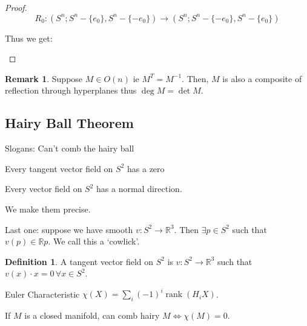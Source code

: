\documentclass{article}
\theoremstyle{definition}
\newtheorem*{definition}{Definition}
\newtheorem*{remark}{Remark}
\begin{document}
\begin{proof}
        \[
            R_0: (S^n; S^n - \{ e_0 \}, S^n - \{ -e_0 \}) \to (S^n; S^n - \{ -e_0 \}, S^n - \{ e_0 \} )
        \]

        Thus we get:
        
        \begin{center}
        \end{center}

    \end{proof}

    \begin{remark}
        Suppose \(M\in O(n)\) ie \(M^T = M ^{-1}\). Then, \(M\) is also a composite of reflection through hyperplanes thus \(\deg M = \det M\).
    \end{remark}

    \subsection*{Hairy Ball Theorem}

    Slogans: Can't comb the hairy ball

    Every tangent vector field on \(S^2\) has a zero
    
    Every vector field on \(S^2\) has a normal direction.

    We make them precise.

    Last one: suppose we have smooth \(v:S^2 \to \mathbb{R}^3\). Then \(\exists p\in S^2\) such that \(v(p)\in\mathbb{R}p\). We call this a `cowlick'.
    
    \begin{definition}
        A tangent vector field on \(S^2\) is \(v:S^2 \to \mathbb{R}^3\) such that \(v(x) \cdot x = 0 \, \forall x\in S^2\).
    \end{definition}

    Euler Characteristic \(\chi(X) = \sum_{i} (-1)^i \operatorname{rank}(H_i X)\).

    If \(M\) is a closed manifold, can comb hairy \(M \iff \chi(M) = 0\).
\end{document}
